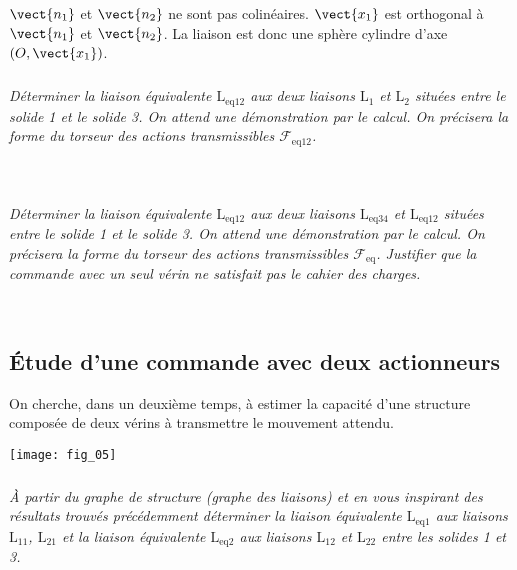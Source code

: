 \begin{multicols}{2}
\begin{corrige}
$\vect{n_1}$ et $\vect{n_2}$ ne sont pas colinéaires. $\vect{x_1}$ est orthogonal à $\vect{n_1}$  et $\vect{n_2}$. La liaison est donc une sphère cylindre d'axe $\left(O,\vect{x_1}\right)$.  
\end{corrige}
\else
\fi


\subparagraph{}\textit{Déterminer la liaison équivalente $\text{L}_{\text{eq}12}$ aux deux liaisons $\text{L}_{1}$ et $\text{L}_{2}$ situées entre le solide 1 et le solide 3. On attend une démonstration par le calcul. On précisera la forme du torseur des actions transmissibles $\mathcal{F}_{\text{eq}12}$.}
\ifprof
\begin{corrige}~\\
\end{corrige}
\else
\fi



\subparagraph{}\textit{Déterminer la liaison équivalente $\text{L}_{\text{eq}12}$ aux deux liaisons $\text{L}_{\text{eq}34}$ et $\text{L}_{\text{eq}12}$ situées entre le solide 1 et le solide 3. On attend une démonstration par le calcul. On précisera la forme du torseur des actions transmissibles $\mathcal{F}_{\text{eq}}$.
Justifier que la commande avec un seul vérin ne satisfait pas le cahier des charges.}
\ifprof
\begin{corrige}~\\
\end{corrige}
\else
\fi

\subsection*{Étude d'une commande avec deux actionneurs}
\begin{obj}
On cherche, dans un deuxième temps, à estimer la capacité d'une structure composée de deux
vérins à transmettre le mouvement attendu.
\end{obj}


\begin{center}
\texttt{[image: fig\_05]}
\end{center}

\subparagraph{}\textit{À partir du graphe de structure (graphe des liaisons) et en vous inspirant des résultats trouvés précédemment déterminer la liaison équivalente $\text{L}_{\text{eq}1}$
aux liaisons $\text{L}_{11}$, $\text{L}_{21}$ et la liaison équivalente $\text{L}_{\text{eq}2}$ aux liaisons $\text{L}_{12}$ et $\text{L}_{22}$ entre les solides 1 et 3.}
\ifprof
\begin{corrige}~\\
\end{corrige}
\else
\fi



\end{multicols}

